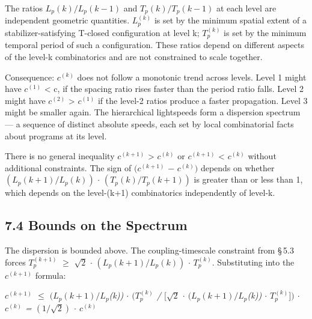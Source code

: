 \documentclass[11pt,oneside]{report}
\theoremstyle{definition}
\theoremstyle{remark}
\begin{document}
The ratios \ensuremath{L_{p}(k)/L_{p}(k-1)} and \ensuremath{T_{p}(k)/T_{p}(k-1)} at each level are
independent geometric quantities. \ensuremath{L_{p}^{(k)}} is set by the minimum
spatial extent of a stabilizer-satisfying T-closed configuration at
level k; \ensuremath{T_{p}^{(k)}} is set by the minimum temporal period of such a
configuration. These ratios depend on different aspects of the level-k
combinatorics and are not constrained to scale together.

Consequence: \ensuremath{c^{(k)}} does not follow a monotonic trend across levels.
Level 1 might have \ensuremath{c^{(1)}} \textless{} c, if the spacing ratio rises
faster than the period ratio falls. Level 2 might have \ensuremath{c^{(2)}}
\textgreater{} \ensuremath{c^{(1)}} if the level-2 ratios produce a faster
propagation. Level 3 might be smaller again. The hierarchical
lightspeeds form a dispersion spectrum --- a sequence of distinct
absolute speeds, each set by local combinatorial facts about programs at
its level.

There is no general inequality \ensuremath{c^{(k+1)}} \textgreater{} \ensuremath{c^{(k)}} or
\ensuremath{c^{(k+1)}} \textless{} \ensuremath{c^{(k)}} without additional constraints. The sign
of \ensuremath{(c^{(k+1)}} \ensuremath{-} \ensuremath{c^{(k)})} depends on whether \ensuremath{(L_{p}(k+1)/L_{p}(k))} \ensuremath{\cdot}
\ensuremath{(T_{p}(k)/T_{p}(k+1))} is greater than or less than 1, which depends on the
level-(k+1) combinatorics independently of level-k.

\subsection*{7.4 Bounds on the Spectrum}

The dispersion is bounded above. The coupling-timescale constraint from
\S\,5.3 forces \ensuremath{T_{p}^{(k+1)}} \ensuremath{\geq} \ensuremath{\sqrt{2}} \ensuremath{\cdot} \ensuremath{(L_{p}(k+1)/L_{p}(k))} \ensuremath{\cdot} \ensuremath{T_{p}^{(k)}.}
Substituting into the \ensuremath{c^{(k+1)}} formula:

\emph{\ensuremath{c^{(k+1)}} \ensuremath{\leq} \ensuremath{(L_{p}}\textbf{\ensuremath{(k+1)/L_{p}}}(k)) \ensuremath{\cdot} \ensuremath{(T_{p}^{(k)}} / \ensuremath{[\sqrt{2}} \ensuremath{\cdot}
\ensuremath{(L_{p}}\textbf{\ensuremath{(k+1)/L_{p}}}(k)) \ensuremath{\cdot} \ensuremath{T_{p}^{(k)}])} \ensuremath{\cdot} \ensuremath{c^{(k)}} = \ensuremath{(1/\sqrt{2})} \ensuremath{\cdot}
\ensuremath{c^{(k)}}}
\end{document}
